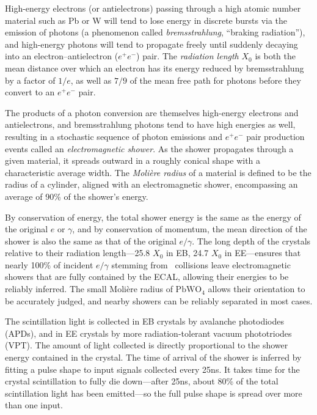 High-energy electrons (or antielectrons) passing through a high atomic number material such as Pb or W will tend to lose energy in discrete
bursts via the emission of photons (a phenomenon called \textit{bremsstrahlung}, ``braking radiation''), and high-energy photons will tend to propagate freely until suddenly decaying into
an electron--antielectron ($e^{+}e^{-}$) pair. The \textit{radiation length} $X_{0}$ is both the mean distance over which an electron has its energy reduced by bremsstrahlung
by a factor of $1/e$, as well as $7/9$ of the mean free path for photons before they convert to an $e^{+}e^{-}$ pair.

The products of a photon conversion are themselves high-energy electrons and antielectrons, and bremsstrahlung photons tend to have high energies as well,
resulting in a stochastic sequence of photon emissions and $e^{+}e^{-}$ pair production events called an \textit{electromagnetic shower}. As the shower
propagates through a given material, it spreads outward in a roughly conical shape with a characteristic average width. The \textit{Molière radius} of a material
is defined to be the radius of a cylinder, aligned with an electromagnetic shower, encompassing an average of 90\% of the shower's energy.

By conservation of energy, the total shower energy is the same as the energy of the original $e$ or $\gamma$, and by conservation of momentum,
the mean direction of the shower is also the same as that of the original $e/\gamma$. The long depth of the crystals relative to their radiation
length---25.8 $X_{0}$ in EB, 24.7 $X_{0}$ in EE---ensures that nearly 100\% of incident $e/\gamma$ stemming
from \Pp\Pp\ collisions leave electromagnetic showers that are fully contained by the ECAL, allowing their energies to be reliably inferred.
The small Molière radius of $\mathrm{PbWO}_{4}$ allows their orientation to be accurately judged, and nearby showers can be reliably separated in most cases.

The scintillation light is collected in EB crystals by avalanche photodiodes (APDs), and in EE crystals by more radiation-tolerant
vacuum phototriodes (VPT). The amount of light collected is directly proportional to the shower energy contained in the crystal.
The time of arrival of the shower is inferred by fitting a pulse shape to input signals collected every 25\unit{ns}. It takes time for the
crystal scintillation to fully die down---after 25\unit{ns}, about 80\% of the total scintillation light has been emitted---so the full pulse shape
is spread over more than one input.

